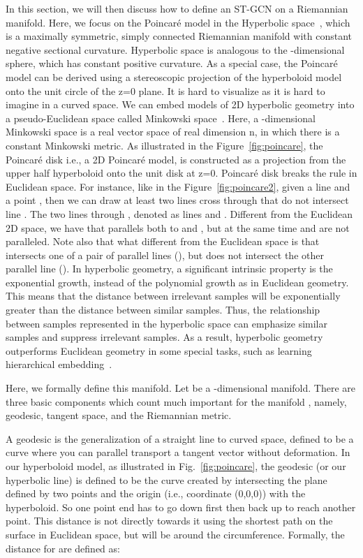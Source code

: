 \documentclass[letterpaper]{article} \usepackage{aaai19}  \usepackage{times}  \usepackage{helvet} \usepackage{courier}  \usepackage[hyphens]{url}  \usepackage{graphicx} \urlstyle{rm} \def\UrlFont{\rm}  \usepackage{graphicx}  \frenchspacing  \setlength{\pdfpagewidth}{8.5in}  \setlength{\pdfpageheight}{11in}
\begin{document}
In this section, we will then discuss how to define an ST-GCN on a Riemannian manifold. Here, we focus on the Poincar\'e model in the Hyperbolic space~\cite{reynolds1993hyperbolic}, which is a maximally symmetric, simply connected Riemannian manifold with constant negative sectional curvature. Hyperbolic space is analogous to the -dimensional sphere, which has constant positive curvature.  As a special case, the Poincar\'e model can be derived using a stereoscopic projection of the hyperboloid model onto the unit circle of the z=0 plane. It is hard to visualize as it is hard to imagine in a curved space. We can embed models of 2D hyperbolic geometry into a pseudo-Euclidean space called Minkowski space~\cite{tataru2001strichartz}. Here, a -dimensional Minkowski space is a real vector space of real dimension n, in which there is a constant Minkowski metric. As illustrated in the Figure~\ref{fig:poincare}, the Poincar\'e disk i.e., a 2D Poincar\'e model, is constructed as a projection from the upper half hyperboloid onto the unit disk at z=0. Poincar\'e disk breaks the rule in Euclidean space. For instance, like in the Figure~\ref{fig:poincare2}, given a line  and a point , then we can draw at least two lines cross through  that do not intersect line .  The two lines through , denoted as lines  and . Different from the Euclidean 2D space, we have that  parallels both to  and , but at the same time  and  are not paralleled. Note also that what different from the Euclidean space is that  intersects one of a pair of parallel lines (), but does not intersect the other parallel line (). In hyperbolic geometry, a significant intrinsic property is the exponential growth, instead of the polynomial growth as in Euclidean geometry. This means that the distance between irrelevant samples will be exponentially greater than the distance between similar samples. Thus, the relationship between samples represented in the hyperbolic space can emphasize similar samples and suppress irrelevant samples. As a result, hyperbolic geometry outperforms Euclidean geometry in some special tasks, such as learning hierarchical embedding~\cite{ganea2018hyperbolic}.

Here, we formally define this manifold. Let  be a -dimensional manifold. There are three basic components which count much important for the manifold , namely, geodesic, tangent space, and the Riemannian metric. 

A geodesic is the generalization of a straight line to curved space, defined to be a curve where you can parallel transport a tangent vector without deformation. In our hyperboloid model, as illustrated in Fig.~\ref{fig:poincare}, the geodesic (or our hyperbolic line) is defined to be the curve created by intersecting the plane defined by two points and the origin (i.e., coordinate (0,0,0)) with the hyperboloid. So one point end has to go down first then back up to reach another point. This distance is not directly towards it using the shortest path on the surface in Euclidean space, but will be around the circumference. Formally, the distance for  are defined as:
\end{document}
